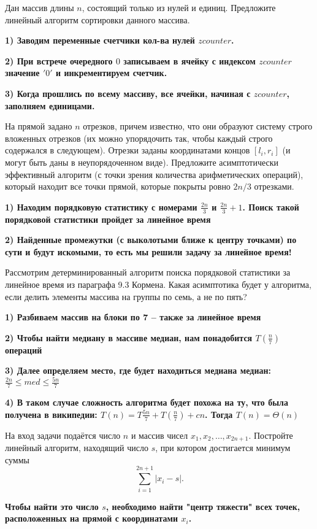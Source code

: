 \documentclass[12pt]{extreport}
\theoremstyle{definiton}
\theoremstyle{definition}
\theoremstyle{definition}
\let\leq\leqslant
\newcounter{problem}
\newcounter{subproblem}
\def\beforPRskip{
	\bigskip
}
\def\pr{\beforPRskip\noindent\stepcounter{problem}{\bf \theproblem .\;}\setcounter{subproblem}{0}}
\begin{document}
	


\pr Дан массив длины $n$, состоящий только из нулей и единиц. Предложите линейный алгоритм сортировки данного массива.


\textbf{1) Заводим переменные счетчики кол-ва нулей $zcounter$.}

\textbf{2) При встрече очередного $0$ записываем в ячейку с индексом $zcounter$ значение $'0'$ и инкрементируем счетчик.}

\textbf{3) Когда прошлись по всему массиву, все ячейки, начиная с $zcounter$, заполняем единицами.}

\pr На прямой задано $n$ отрезков, причем известно, что они образуют систему строго вложенных отрезков (их можно упорядочить так, чтобы каждый строго содержался в следующем). Отрезки заданы координатами концов $[l_i, r_i]$ (и могут быть даны в неупорядоченном виде). Предложите асимптотически эффективный алгоритм (с точки зрения количества арифметических операций), который находит все точки прямой, которые покрыты ровно $2n/3$ отрезками.

\textbf{1) Находим порядковую статистику с номерами $\frac{2n}{3}$ и $\frac{2n}{3} + 1$. Поиск такой порядковой статистики пройдет за линейное время}

\textbf{2) Найденные промежутки (с выколотыми ближе к центру точками) по сути и будут искомыми, то есть мы решили задачу за линейное время!}

\pr Рассмотрим детерминированный алгоритм поиска порядковой статистики за линейное время из параграфа 9.3 Кормена. Какая асимптотика будет у алгоритма, если делить элементы массива на группы по семь, а не по пять?

\textbf{1) Разбиваем массив на блоки по 7 -- также за линейное время}

\textbf{2) Чтобы найти медиану в массиве медиан, нам понадобится $T(\frac{n}{7})$ операций}

\textbf{3) Далее определяем место, где будет находиться медиана медиан: $\frac{2n}{7} \leq med \leq \frac{5n}{7}$}

\textbf{4) В таком случае сложность алгоритма будет похожа на ту, что была получена в википедии: $T(n) = T\frac{5n}{7} + T(\frac{n}{7}) + cn$. Тогда $T(n) = \Theta(n)$}

\pr На вход задачи подаётся число $n$ и массив чисел $x_1, x_2, \ldots, x_{2n+1}$. Постройте линейный алгоритм, находящий число $s$, при котором достигается минимум суммы $$ \sum\limits_{i=1}^{2n+1}|x_i - s|. $$

\textbf{Чтобы найти это число $s$, необходимо найти "центр тяжести" всех точек, расположенных на прямой с координатами $x_i$.}
\end{document}
